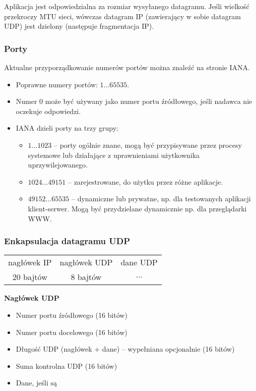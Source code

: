 \documentclass[a4paper]{article}
\begin{document}
Aplikacja jest odpowiedzialna za rozmiar wysyłanego datagramu. Jeśli wielkość przekroczy
MTU sieci, wówczas datagram IP (zawierający w sobie datagram UDP) jest dzielony
(następuje fragmentacja IP).


\subsubsection{Porty}
Aktualne przyporządkowanie numerów portów można znaleźć na stronie IANA.
\begin{itemize}
    \item Poprawne numery portów: $1 \dots 65535$.
    \item Numer 0 może być używany jako numer portu źródłowego, jeśli nadawca nie oczekuje odpowiedzi.
\\
    \item IANA dzieli porty na trzy grupy:
    \begin{itemize}
        \item $1 \dots 1023$ – porty ogólnie znane, mogą być przypisywane przez procesy systemowe lub działające z uprawnieniami użytkownika uprzywilejowanego.
        \item $1024 \dots 49151$ – zarejestrowane, do użytku przez różne aplikacje.
        \item $49152 \dots 65535$ – dynamiczne lub prywatne, np. dla testowanych aplikacji klient-serwer. Mogą być przydzielane dynamicznie np. dla przeglądarki WWW.
\end{itemize}
\end{itemize}

\subsubsection{Enkapsulacja datagramu UDP}

\begin{tabular}{|c|c|c|}
\hline
nagłówek IP & nagłówek UDP & dane UDP\\
20 bajtów & 8 bajtów & $\dots$\\
\hline
\end{tabular}

\textbf{Nagłówek UDP}
\begin{itemize}
    \item Numer portu źródłowego (16 bitów)
    \item Numer portu docelowego (16 bitów)
    \item Długość UDP (nagłówek + dane) – wypełniana opcjonalnie (16 bitów)
    \item Suma kontrolna UDP (16 bitów)
    \item Dane, jeśli są
\end{itemize}
\end{document}
